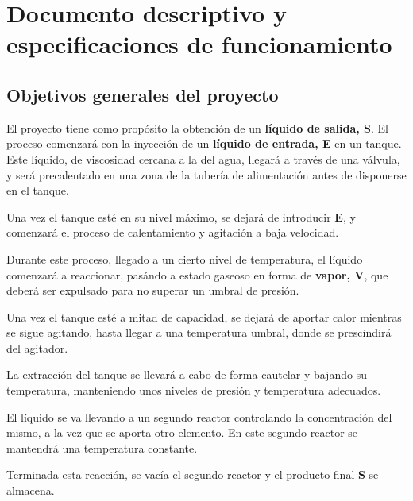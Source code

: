 \section{Documento descriptivo y especificaciones de funcionamiento} \label{sec: Sec1}

\subsection{Objetivos generales del proyecto} \label{subsec: SubSec11}

El proyecto tiene como propósito la obtención de un \textbf{líquido de salida, S}. El proceso comenzará con la inyección de un \textbf{líquido de entrada, E} en un tanque. Este líquido, de viscosidad cercana a la del agua, llegará a través de una válvula, y será precalentado en una zona de la tubería de alimentación antes de disponerse en el tanque.

Una vez el tanque esté en su nivel máximo, se dejará de introducir \textbf{E}, y comenzará el proceso de calentamiento y agitación a baja velocidad. 

Durante este proceso, llegado a un cierto nivel de temperatura, el líquido comenzará a reaccionar, pasándo a estado gaseoso en forma de \textbf{vapor, V}, que deberá ser expulsado para no superar un umbral de presión.

Una vez el tanque esté a mitad de capacidad, se dejará de aportar calor mientras se sigue agitando, hasta llegar a una temperatura umbral, donde se prescindirá del agitador.

La extracción del tanque se llevará a cabo de forma cautelar y bajando su temperatura, manteniendo unos niveles de presión y temperatura adecuados.

El líquido se va llevando a un segundo reactor controlando la concentración del mismo, a la vez que se aporta otro elemento. En este segundo reactor se mantendrá una temperatura constante.

Terminada esta reacción, se vacía el segundo reactor y el producto final \textbf{S} se almacena.
